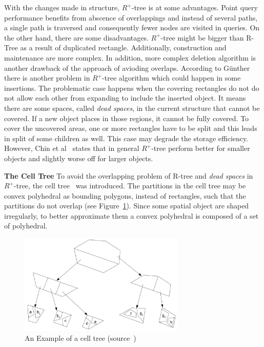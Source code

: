 \documentclass[a4paper,12pt]{article}
\begin{document}
With the changes made in structure, {$R^+$-tree} is at some advantages. Point query performance benefits from abscence of overlappings and instead of several paths, a single path is traversed and consequently fewer nodes are visited in queries. On the other hand, there are some disadvantages. 
{$R^+$-tree} might be bigger than R-Tree as a result of duplicated rectangle. Additionally, construction and maintenance are more complex. In addition, more complex deletion algorithm is another drawback of the approach of avioding overlaps.  
According to Günther~\cite{efficientstruct} there is another problem in {$R^+$-tree} algorithm which could happen in some insertions. The problematic case happens when the covering rectangles do not do not allow each other from expanding to include the inserted object. It means there are some spaces, called \textit{dead spaces}, in the current structure that cannot be covered. If a new object places in those regions, it cannot be fully covered. To cover the uncovered areas, one or more rectangles have to be split and this leads in split of some children as well. This case may degrade the storage efficiency. However, Chin et al~\cite{survey} states that in general {$R^+$-tree} perform better for smaller objects and slightly worse off for larger objects.

\textbf{The Cell Tree}
To avoid the overlapping problem of R-tree and \textit{dead spaces} in $R^+$-tree, the cell tree~\cite{celltree} was introduced. The partitions in the cell tree may be convex polyhedral as bounding polygons, instead of rectangles, such that the partitions do not overlap (see Figure~\ref{figcelltree}). Since some spatial object are shaped irregularly, to better approximate them a convex polyhedral is composed of a set of polyhedral. 

\begin{figure}
\centering
\includegraphics[width=0.7\textwidth]{CellTree}
\caption{An Example of a cell tree (source~\cite{survey})}
\label{figcelltree}
\end{figure}
\end{document}
